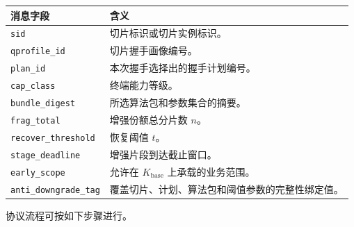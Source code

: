 \documentclass[12pt,a4paper]{article}
\newcommand{\Kbase}{K_{\mathrm{base}}}
\begin{document}
\begin{center}
\renewcommand{\arraystretch}{1.35}
\begin{tabular}{|p{3.2cm}|p{10.8cm}|}
\hline
消息字段 & 含义 \\ \hline
\texttt{sid} & 切片标识或切片实例标识。 \\ \hline
\texttt{qprofile\_id} & 切片握手画像编号。 \\ \hline
\texttt{plan\_id} & 本次握手选择出的握手计划编号。 \\ \hline
\texttt{cap\_class} & 终端能力等级。 \\ \hline
\texttt{bundle\_digest} & 所选算法包和参数集合的摘要。 \\ \hline
\texttt{frag\_total} & 增强份额总分片数 $n$。 \\ \hline
\texttt{recover\_threshold} & 恢复阈值 $t$。 \\ \hline
\texttt{stage\_deadline} & 增强片段到达截止窗口。 \\ \hline
\texttt{early\_scope} & 允许在 $\Kbase$ 上承载的业务范围。 \\ \hline
\texttt{anti\_downgrade\_tag} & 覆盖切片、计划、算法包和阈值参数的完整性绑定值。 \\ \hline
\end{tabular}
\end{center}

协议流程可按如下步骤进行。
\end{document}
